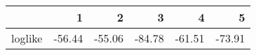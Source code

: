 \begin{table}[ht]
\centering
\begin{tabular}{rrrrrr}
  \hline
 & 1 & 2 & 3 & 4 & 5 \\ 
  \hline
loglike & -56.44 & -55.06 & -84.78 & -61.51 & -73.91 \\ 
   \hline
\end{tabular}
\caption{} 
\label{fig ecoli-5CV}
\end{table}
